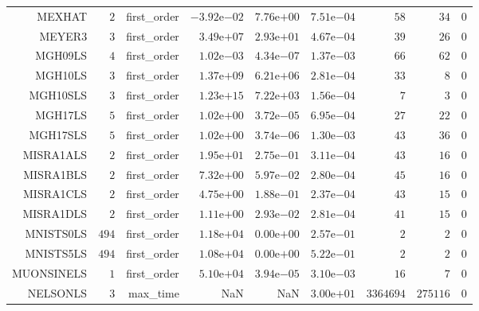 \begin{longtable}{rrrrrrrrr}
MEXHAT & \(     2\) & first\_order & \(-3.92\)e\(-02\) & \( 7.76\)e\(+00\) & \( 7.51\)e\(-04\) & \(    58\) & \(    34\) & \(     0\) \\
MEYER3 & \(     3\) & first\_order & \( 3.49\)e\(+07\) & \( 2.93\)e\(+01\) & \( 4.67\)e\(-04\) & \(    39\) & \(    26\) & \(     0\) \\
MGH09LS & \(     4\) & first\_order & \( 1.02\)e\(-03\) & \( 4.34\)e\(-07\) & \( 1.37\)e\(-03\) & \(    66\) & \(    62\) & \(     0\) \\
MGH10LS & \(     3\) & first\_order & \( 1.37\)e\(+09\) & \( 6.21\)e\(+06\) & \( 2.81\)e\(-04\) & \(    33\) & \(     8\) & \(     0\) \\
MGH10SLS & \(     3\) & first\_order & \( 1.23\)e\(+15\) & \( 7.22\)e\(+03\) & \( 1.56\)e\(-04\) & \(     7\) & \(     3\) & \(     0\) \\
MGH17LS & \(     5\) & first\_order & \( 1.02\)e\(+00\) & \( 3.72\)e\(-05\) & \( 6.95\)e\(-04\) & \(    27\) & \(    22\) & \(     0\) \\
MGH17SLS & \(     5\) & first\_order & \( 1.02\)e\(+00\) & \( 3.74\)e\(-06\) & \( 1.30\)e\(-03\) & \(    43\) & \(    36\) & \(     0\) \\
MISRA1ALS & \(     2\) & first\_order & \( 1.95\)e\(+01\) & \( 2.75\)e\(-01\) & \( 3.11\)e\(-04\) & \(    43\) & \(    16\) & \(     0\) \\
MISRA1BLS & \(     2\) & first\_order & \( 7.32\)e\(+00\) & \( 5.97\)e\(-02\) & \( 2.80\)e\(-04\) & \(    45\) & \(    16\) & \(     0\) \\
MISRA1CLS & \(     2\) & first\_order & \( 4.75\)e\(+00\) & \( 1.88\)e\(-01\) & \( 2.37\)e\(-04\) & \(    43\) & \(    15\) & \(     0\) \\
MISRA1DLS & \(     2\) & first\_order & \( 1.11\)e\(+00\) & \( 2.93\)e\(-02\) & \( 2.81\)e\(-04\) & \(    41\) & \(    15\) & \(     0\) \\
MNISTS0LS & \(   494\) & first\_order & \( 1.18\)e\(+04\) & \( 0.00\)e\(+00\) & \( 2.57\)e\(-01\) & \(     2\) & \(     2\) & \(     0\) \\
MNISTS5LS & \(   494\) & first\_order & \( 1.08\)e\(+04\) & \( 0.00\)e\(+00\) & \( 5.22\)e\(-01\) & \(     2\) & \(     2\) & \(     0\) \\
MUONSINELS & \(     1\) & first\_order & \( 5.10\)e\(+04\) & \( 3.94\)e\(-05\) & \( 3.10\)e\(-03\) & \(    16\) & \(     7\) & \(     0\) \\
NELSONLS & \(     3\) & max\_time &       NaN &       NaN & \( 3.00\)e\(+01\) & \(3364694\) & \(275116\) & \(     0\) \\

\end{longtable}
